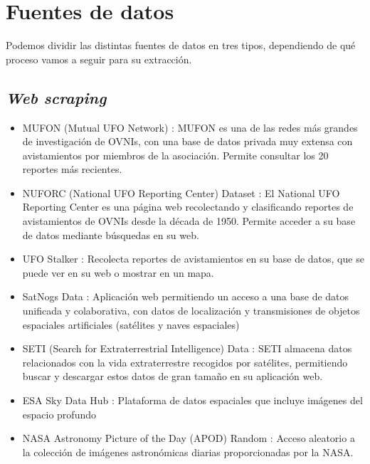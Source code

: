 \section{Fuentes de datos}

Podemos dividir las distintas fuentes de datos en tres tipos, dependiendo de qué proceso vamos a seguir para su extracción.


\subsection*{\textit{Web scraping}}
\begin{itemize}
  \item MUFON (Mutual UFO Network) \cite{mufon-scraping}: MUFON es una de las redes más grandes de investigación de OVNIs, con una base de datos privada muy extensa con avistamientos por miembros de la asociación. Permite consultar los 20 reportes más recientes.
  \item NUFORC (National UFO Reporting Center) Dataset \cite{nuforc-scraping}: El National UFO Reporting Center es una página web recolectando y clasificando reportes de avistamientos de OVNIs desde la década de 1950. Permite acceder a su base de datos mediante búsquedas en su web.
  \item UFO Stalker \cite{ufostalker-scraping}: Recolecta reportes de avistamientos en su base de datos, que se puede ver en su web o mostrar en un mapa.
  \item SatNogs Data \cite{satnogs-scraping}: Aplicación web permitiendo un acceso a una base de datos unificada y colaborativa, con datos de localización y transmisiones de objetos espaciales artificiales (satélites y naves espaciales)
  \item SETI (Search for Extraterrestrial Intelligence) Data \cite{seti-scraping}: SETI almacena datos relacionados con la vida extraterrestre recogidos por satélites, permitiendo buscar y descargar estos datos de gran tamaño en su aplicación web.
  \item ESA Sky Data Hub \cite{esa-sky-scraping}: Plataforma de datos espaciales que incluye imágenes del espacio profundo
  \item NASA Astronomy Picture of the Day (APOD) Random \cite{nasa-apod-scraping}: Acceso aleatorio a la colección de imágenes astronómicas diarias proporcionadas por la NASA.
\end{itemize}


